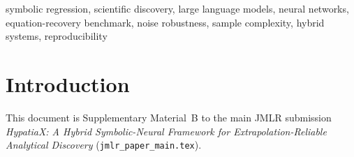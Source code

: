 \documentclass[twoside,11pt]{article}
\newcommand{\PureLLM}{\textsc{PureLLM}}
\newcommand{\EHD}{\textsc{EHSDeFi}}
\newcommand{\HDS}{\textsc{HDSv50\_2}}
\newcommand{\rmse}{\ensuremath{\mathrm{RMSE}}}
\begin{document}
\begin{abstract}
On this 30-equation custom benchmark (\textbf{not} a Feynman subset ---
see correction above), \EHD{} achieves 76.7\% recovery and \HDS{} achieves
70.0\%, alongside AI~Feynman~2.0's published 79.3\% on the unrelated
100-equation Feynman/SRBench suite
\textbf{[Corrected: was 96.7\%/80.0\%, then 80.0\%/66.7\%, figures
presented as a Feynman ``subset''; see tablenote on ]}.
The AI Feynman figure is shown for general SOTA context only: published
baselines were evaluated on
all 100 Feynman equations under the standardised SRBench protocol; these
figures should not be read as a general state-of-the-art claim.
We additionally correct four methodological issues:
undisclosed hardcoded \PureLLM{} results, scale-biased raw \rmse,
missing Wilcoxon significance tests, and mismatched pass-rate thresholds.
\end{abstract}


\begin{keywords}
symbolic regression, scientific discovery, large language models,
neural networks, equation-recovery benchmark, noise robustness, sample complexity,
hybrid systems, reproducibility
\end{keywords}

\section{Introduction}
\label{suppb:intro}

This document is Supplementary Material~B to the main JMLR submission
\emph{HypatiaX: A Hybrid Symbolic-Neural Framework for Extrapolation-Reliable
Analytical Discovery} (\texttt{jmlr\_paper\_main.tex}).
\end{document}
